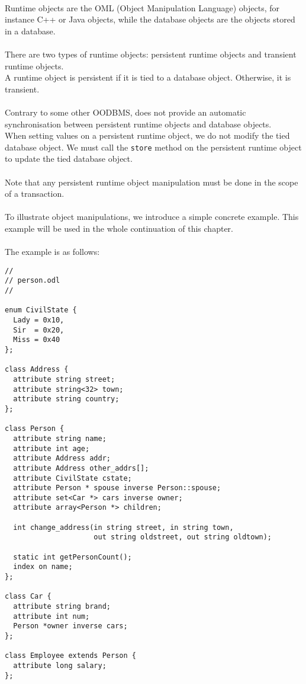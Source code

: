 \\
Runtime objects are the OML (Object Manipulation Language) objects,
for instance C++ or Java objects, while the database objects are
the objects stored in a database.
\\
\\
There are two types of runtime objects: persistent runtime objects and
transient runtime objects.
\\
A runtime object is persistent if it is tied to a database object.
Otherwise, it is  transient.
\\
\\
Contrary to some other OODBMS, \eyedb does not
provide an automatic synchronisation between persistent runtime objects
and database objects.
\\
When setting values on a persistent runtime object, we do not modify
the tied database object.
We must call the \texttt{store} method on the persistent runtime object
to update the tied database object.
\\
\\
Note that any persistent runtime object manipulation must be done
in the scope of a transaction.
\\
\\
To illustrate object manipulations, we introduce a simple concrete
example.
This example will be used in the whole continuation of this chapter.
\\
\\
The example is as follows:
\verbsize
\begin{verbatim}
//
// person.odl
//

enum CivilState {
  Lady = 0x10,
  Sir  = 0x20,
  Miss = 0x40
};

class Address {
  attribute string street;
  attribute string<32> town;
  attribute string country;
};

class Person {
  attribute string name;
  attribute int age;
  attribute Address addr;
  attribute Address other_addrs[];
  attribute CivilState cstate;
  attribute Person * spouse inverse Person::spouse;
  attribute set<Car *> cars inverse owner;
  attribute array<Person *> children;

  int change_address(in string street, in string town,
                     out string oldstreet, out string oldtown);

  static int getPersonCount();
  index on name;
};

class Car {
  attribute string brand;
  attribute int num;
  Person *owner inverse cars;
};

class Employee extends Person {
  attribute long salary;
};
\end{verbatim}

